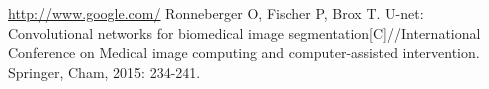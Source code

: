 \newpage
\begin{thebibliography}{99}
	\url{http://www.google.com/}
	Ronneberger O, Fischer P, Brox T. U-net: Convolutional networks for biomedical image segmentation[C]//International Conference on Medical image computing and computer-assisted intervention. Springer, Cham, 2015: 234-241.
\end{thebibliography}
